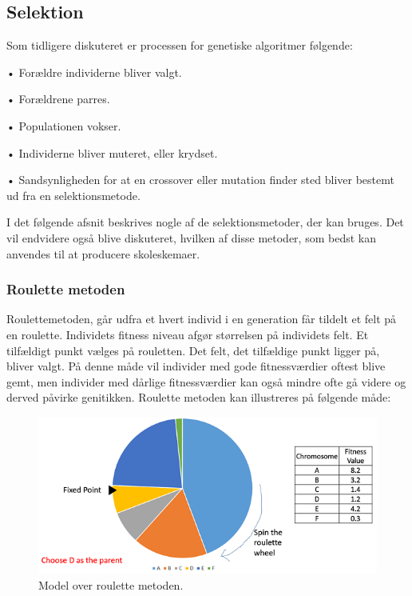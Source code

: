 \subsection{Selektion}
Som tidligere diskuteret er processen for genetiske algoritmer følgende:

•	Forældre individerne bliver valgt.


•	Forældrene parres.


•	Populationen vokser.


•	Individerne bliver muteret, eller krydset.


•	Sandsynligheden for at en crossover eller mutation finder sted bliver bestemt ud fra en selektionsmetode.


I det følgende afsnit beskrives nogle af de selektionsmetoder, der kan bruges. Det vil endvidere også blive diskuteret, hvilken af disse metoder, som bedst kan anvendes til at producere skoleskemaer.

\subsubsection{Roulette metoden}
Roulettemetoden, går udfra et hvert individ i en generation får tildelt et felt på en roulette. Individets fitness niveau afgør størrelsen på individets felt. Et tilfældigt punkt vælges på rouletten. Det felt, det tilfældige punkt ligger på, bliver valgt. På denne måde vil individer med gode fitnessværdier oftest blive gemt, men individer med dårlige fitnessværdier kan også mindre ofte gå videre og derved påvirke genitikken. 
Roulette metoden kan illustreres på følgende måde:
\begin{figure}[!h]
  \centering
  \includegraphics[width=\textwidth]{partials/graphics/roulette.png}
  \caption{Model over roulette metoden.}
  \label{fig:roulette}
\end{figure}

